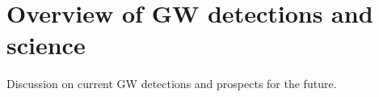 \documentclass[main.tex]{subfiles}
\begin{document}
\section{Overview of GW detections and science}


Discussion on current GW detections and prospects for the future. 
\end{document}
